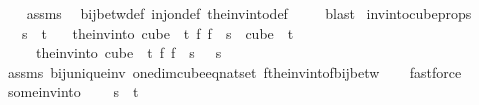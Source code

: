 \begin{isabellebody}
%
\isadelimproof
\ \ %
\endisadelimproof
%
\isatagproof
{}\isamarkupfalse%
\ assms\ \isamarkupfalse%
\ bij{\isacharunderscore}{\kern0pt}betw{\isacharunderscore}{\kern0pt}def\ inj{\isacharunderscore}{\kern0pt}on{\isacharunderscore}{\kern0pt}def\ the{\isacharunderscore}{\kern0pt}inv{\isacharunderscore}{\kern0pt}into{\isacharunderscore}{\kern0pt}def\ \isanewline
\ \ \isamarkupfalse%
\ blast%
\endisatagproof
{\isafoldproof}%
%
\isadelimproof
\isanewline
%
\endisadelimproof
\isanewline
{}\isamarkupfalse%
\ inv{\isacharunderscore}{\kern0pt}into{\isacharunderscore}{\kern0pt}cube{\isacharunderscore}{\kern0pt}props{\isacharcolon}{\kern0pt}\isanewline
\ \ \ {\isachardoublequoteopen}s\ {\isacharless}{\kern0pt}\ t{\isachardoublequoteclose}\isanewline
\ \ \ {\isachardoublequoteopen}the{\isacharunderscore}{\kern0pt}inv{\isacharunderscore}{\kern0pt}into\ {\isacharparenleft}{\kern0pt}cube\ {}\ t{\isacharparenright}{\kern0pt}\ {\isacharparenleft}{\kern0pt}{\isasymlambda}f{\isachardot}{\kern0pt}\ f\ {}{\isacharparenright}{\kern0pt}\ s\ {\isasymin}\ cube\ {}\ t{\isachardoublequoteclose}\ \isanewline
\ \ \ \ \ {\isachardoublequoteopen}the{\isacharunderscore}{\kern0pt}inv{\isacharunderscore}{\kern0pt}into\ {\isacharparenleft}{\kern0pt}cube\ {}\ t{\isacharparenright}{\kern0pt}\ {\isacharparenleft}{\kern0pt}{\isasymlambda}f{\isachardot}{\kern0pt}\ f\ {}{\isacharparenright}{\kern0pt}\ s\ {}\ {\isacharequal}{\kern0pt}\ s{\isachardoublequoteclose}\isanewline
%
\isadelimproof
\ \ %
\endisadelimproof
%
\isatagproof
{}\isamarkupfalse%
\ assms\ bij{\isacharunderscore}{\kern0pt}unique{\isacharunderscore}{\kern0pt}inv\ one{\isacharunderscore}{\kern0pt}dim{\isacharunderscore}{\kern0pt}cube{\isacharunderscore}{\kern0pt}eq{\isacharunderscore}{\kern0pt}nat{\isacharunderscore}{\kern0pt}set\ f{\isacharunderscore}{\kern0pt}the{\isacharunderscore}{\kern0pt}inv{\isacharunderscore}{\kern0pt}into{\isacharunderscore}{\kern0pt}f{\isacharunderscore}{\kern0pt}bij{\isacharunderscore}{\kern0pt}betw\isanewline
\ \ \isamarkupfalse%
\ fastforce{\isacharplus}{\kern0pt}%
\endisatagproof
{\isafoldproof}%
%
\isadelimproof
\isanewline
%
\endisadelimproof
\isanewline
{}\isamarkupfalse%
\ some{\isacharunderscore}{\kern0pt}inv{\isacharunderscore}{\kern0pt}into{\isacharcolon}{\kern0pt}\ \isanewline
\ \ \ {\isachardoublequoteopen}s\ {\isacharless}{\kern0pt}\ t{\isachardoublequoteclose}\ \isanewline

\end{isabellebody}
